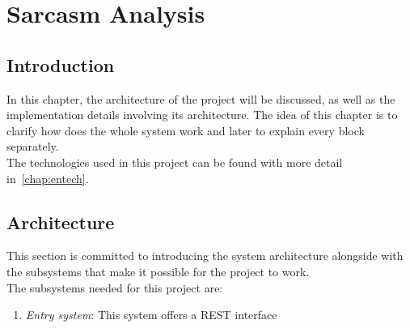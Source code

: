 \chapter{Sarcasm Analysis}
\label{chap:architecture}


\section{Introduction}
\label{sec:introduction}
In this chapter, the architecture of the project will be discussed, as well as the implementation details involving its architecture. The idea of this chapter is to clarify how does the whole system work and later to explain every block separately.\\
The technologies used in this project can be found with more detail in~\cref{chap:entech}.

\section{Architecture}
This section is committed to introducing the system architecture alongside with the subsystems that make it possible for the project to work.\\
The subsystems needed for this project are:
\begin{enumerate}
	\item \textit{Entry system}: This system offers a REST interface	
\end{enumerate}